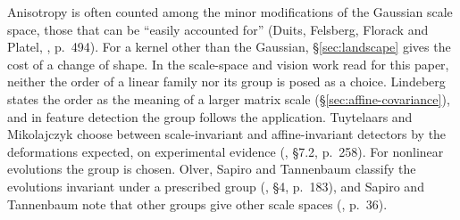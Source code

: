 Anisotropy is often counted among the minor modifications of the Gaussian scale space, those that can
be ``easily accounted for'' (Duits, Felsberg, Florack and Platel, , p.~494).
For a kernel other than the Gaussian, \S\ref{sec:landscape} gives the cost of a change of shape.
In the scale-space and vision work read for this paper, neither the order of a linear family nor its
group is posed as a choice. Lindeberg states the order as the meaning of a larger matrix scale (\S\ref{sec:affine-covariance}),
and in feature detection the group follows the application. Tuytelaars and Mikolajczyk choose between
scale-invariant and affine-invariant detectors by the deformations expected, on experimental evidence
(, \S7.2, p.~258). For nonlinear evolutions the group is chosen. Olver,
Sapiro and Tannenbaum classify the evolutions invariant under a prescribed group
(, \S4, p.~183), and Sapiro and Tannenbaum note that other groups give other
scale spaces (, p.~36).

